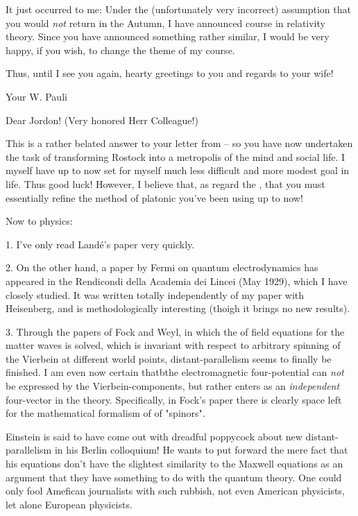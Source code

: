 \documentclass{article}
\begin{document}
It just occurred to me: Under the (unfortunately very incorrect) assumption that you would \textit{not} return in the Autumn, I have announced course in relativity theory. Since you have announced something rather similar, I would be very happy, if you wish, to change the theme of my course.

Thus, until I see you again, hearty greetings to you and regards to your wife!

Your W. Pauli

\date{November 30, 1929}

Dear Jordon!
(Very honored Herr Colleague!)

This is a rather belated answer to your letter from  -- so you have now undertaken the task of transforming Rostock into a metropolis of the mind and social life. I myself have up to now set for myself much less difficult and more modest goal in life. Thus good luck! However, I believe that, as regard the , that you must essentially refine the method of platonic  you've been using up to now!

Now to physics:

1. I've only read Land\'e's paper very quickly.

2. On the other hand, a paper by Fermi on quantum electrodynamics has appeared in the Rendicondi della Academia dei Lincei (May 1929), which I have closely studied. It was written totally independently of my paper with Heisenberg, and is methodologically interesting (thoigh it brings no new results).

3. Through the papers of Fock and Weyl, in which the  of field equations for the matter waves is solved, which is invariant with respect to arbitrary spinning of the Vierbein at different world points, distant-parallelism seems to finally be finished. I am even now certain thatbthe electromagnetic four-potential can \textit{not} be expressed by the Vierbein-components, but rather enters as an \textit{independent} four-vector in the theory. Specifically, in Fock's paper there is clearly space left for the mathematical formalism of  of "spinors".

Einstein is said to have come out with dreadful poppycock about new distant-parallelism in his Berlin colloquium! He wants to put forward the mere fact that his equations don't have the slightest similarity to the Maxwell equations as an argument that they have something to do with the quantum theory. One could only fool Amefican journalists with such rubbish, not even American physicists, let alone European physicists.
\end{document}
